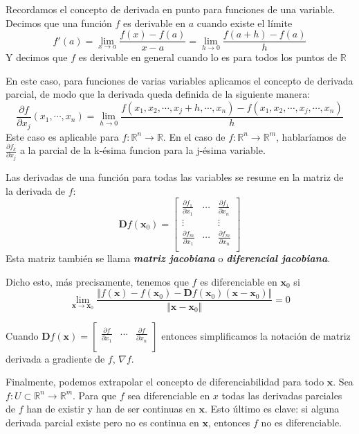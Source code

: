 \documentclass[a4paper]{article}
\begin{document}
Recordamos el concepto de derivada en punto para funciones de una variable. Decimos que una función $f$ es derivable en $a$ cuando existe el límite
\[f'(a) = \lim_{x\rightarrow a}\frac{f(x)-f(a)}{x-a} = \lim_{h\rightarrow 0}\frac{f(a+h)-f(a)}{h}\]
Y decimos que $f$ es derivable en general cuando lo es para todos los puntos de $\mathbb{R}$

En este caso, para funciones de varias variables aplicamos el concepto de derivada parcial, de modo que la derivada queda definida de la siguiente manera:
\[ \frac{\partial f}{\partial x_j}(x_1,\cdots,x_n) = \lim_{h\rightarrow 0}\frac{f(x_1,x_2,\cdots,x_j+h,\cdots,x_n) - f(x_1,x_2,\cdots,x_j,\cdots,x_n)}{h} \]
Este caso es aplicable para $f:\mathbb{R}^n\rightarrow\mathbb{R}$. En el caso de $f:\mathbb{R}^n\rightarrow\mathbb{R}^m$, hablaríamos de $\frac{\partial f_k}{\partial x_j}$ a la parcial de la k-ésima funcion para la j-ésima variable.

Las derivadas de una función para todas las variables se resume en la matriz de la derivada de $f$:
\[\textbf{D}f(\textbf{x}_0) = \left[\begin{matrix}
\frac{\partial f_1}{\partial x_1} & \cdots & \frac{\partial f_1}{\partial x_n}\\
\vdots & & \vdots\\
\frac{\partial f_m}{\partial x_1} & \cdots & \frac{\partial f_m}{\partial x_n}\\
\end{matrix}\right]  \]
Esta matriz también se llama \textbf{\textit{matriz jacobiana}} o \textit{\textbf{diferencial jacobiana}}.

Dicho esto, más precisamente, tenemos que $f$ es diferenciable en $\textbf{x}_0$ si
\[ \lim_{\textbf{x}\rightarrow \textbf{x}_0}\frac{\Vert f(\textbf{x}) - f(\textbf{x}_0)-\textbf{D}f(\textbf{x}_0)(\textbf{x}-\textbf{x}_0)\Vert}{\Vert\textbf{x}-\textbf{x}_0\Vert} = 0 \]

Cuando $\textbf{D}f(\textbf{x}) = \left[\begin{matrix}
\frac{\partial f}{\partial x_1} & \cdots & \frac{\partial f}{\partial x_n}\\ 
\end{matrix}\right]  $ entonces simplificamos la notación de matriz derivada a gradiente de $f$, $\nabla f$. 

Finalmente, podemos extrapolar el concepto de diferenciabilidad para todo $\textbf{x}$. Sea $f:U\subset \mathbb{R}^n \rightarrow \mathbb{R}^m$. Para que $f$ sea diferenciable en $x$ todas las derivadas parciales de $f$ han de existir y han de ser continuas en $\textbf{x}$. Esto último es clave: si alguna derivada parcial existe pero no es continua en $\textbf{x}$, entonces $f$ no es diferenciable. 
\end{document}
